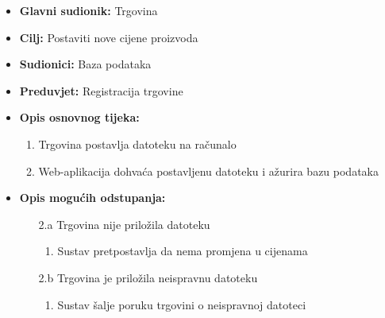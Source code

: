                         \noindent {}
					\begin{itemize}
	
						\item \textbf{Glavni sudionik: }Trgovina
						\item  \textbf{Cilj:} Postaviti nove cijene proizvoda
						\item  \textbf{Sudionici:} Baza podataka
						\item  \textbf{Preduvjet:} Registracija trgovine
						\item  \textbf{Opis osnovnog tijeka:}
						
						\item[] \begin{enumerate}
							\item Trgovina postavlja datoteku na računalo 
                                \item Web-aplikacija dohvaća postavljenu datoteku i ažurira bazu podataka
						\end{enumerate}

                            \item  \textbf{Opis mogućih odstupanja:}
						
						\item[] \begin{enumerate}
	
							\item[2.a] Trgovina nije priložila datoteku
							\item[] \begin{enumerate}
								
								\item Sustav pretpostavlja da nema promjena u cijenama\\
								
							\end{enumerate}
							\item[2.b] Trgovina je priložila neispravnu datoteku
							\item[] \begin{enumerate}
								\item Sustav šalje poruku trgovini o neispravnoj datoteci
							\end{enumerate}
			
							
						\end{enumerate}
						
					\end{itemize}


